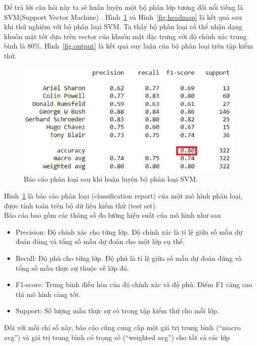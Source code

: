 \documentclass[12pt,a4paper,oneside]{report}
\numberwithin{equation}{section}
\begin{document}
Để trả lời câu hỏi này ta sẽ huấn luyện một bộ phân lớp tương đối nổi tiếng là SVM(Support Vector Machine) \cite{cristianini2000}.
Hình~\ref{fig:svm_result} và Hình~\ref{fig:headmap}  là kết quả sau khi thử nghiệm với bộ phân loại SVM. Ta thấy bộ phân loại có thể nhận dạng khuôn mặt tốt dựa trên vector của khuôn mặt đặc trưng với độ chính xác trung bình là $80\%$. Hình~\ref{fig:output} là kết quả suy luận của bộ phân loại trên tập kiểm thử.
\begin{figure}[htp]
	\centering
	\includegraphics[scale=0.8]{result_svm.png}
	\caption{Báo cáo phân loại sau khi huận luyện bộ phân loại SVM.}
	\label{fig:svm_result}
\end{figure}
Hình~\ref{fig:svm_result} là báo cáo phân loại (classification report) của một mô hình phân loại, được tính toán trên bộ dữ liệu kiểm thử (test set).\\
Báo cáo bao gồm các thông số đo lường hiệu suất của mô hình như sau
\begin{itemize}
\item Precision: Độ chính xác cho từng lớp. Độ chính xác là tỉ lệ giữa số mẫu dự đoán đúng và tổng số mẫu dự đoán cho một lớp cụ thể.

\item Recall: Độ phủ cho từng lớp. Độ phủ là tỉ lệ giữa số mẫu dự đoán đúng và tổng số mẫu thực sự thuộc về lớp đó.

\item F1-score: Trung bình điều hòa của độ chính xác và độ phủ. Điểm F1 càng cao thì mô hình càng tốt.

\item Support: Số lượng mẫu thực sự có trong tập kiểm thử cho mỗi lớp.
\end{itemize}
Đối với mỗi chỉ số này, báo cáo cũng cung cấp một giá trị trung bình (\textquotedblleft macro avg\textquotedblright) và giá trị trung bình có trọng số (\textquotedblleft weighted avg\textquotedblright) cho tất cả các lớp
\end{document}
